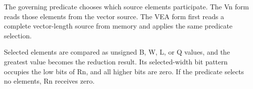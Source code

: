 The governing predicate chooses which source elements participate. The Vn form
reads those elements from the vector source. The VEA form first reads a complete
vector-length source from memory and applies the same predicate selection.

Selected elements are compared as unsigned B, W, L, or Q values, and the
greatest value becomes the reduction result. Its selected-width bit pattern
occupies the low bits of Rn, and all higher bits are zero. If the predicate
selects no elements, Rn receives zero.
